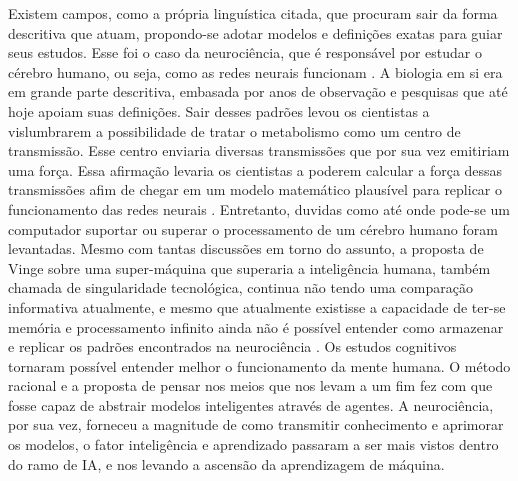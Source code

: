 Existem campos, como a própria linguística citada, que procuram sair da forma descritiva que atuam, propondo-se adotar modelos e definições exatas para guiar seus estudos. Esse foi o caso da neurociência, que é responsável por estudar o cérebro humano, ou seja, como as redes neurais funcionam \cite[10]{russell2003artificial}. A biologia em si era em grande parte descritiva, embasada por anos de observação e pesquisas que até hoje apoiam suas definições. Sair desses padrões levou os cientistas a vislumbrarem a possibilidade de tratar o metabolismo como um centro de transmissão. Esse centro enviaria diversas transmissões que por sua vez emitiriam uma força. Essa afirmação levaria os cientistas a poderem calcular a força dessas transmissões afim de chegar em um modelo matemático plausível para replicar o funcionamento das redes neurais \cite[1-3]{rashevsky1960mathematical}. Entretanto, duvidas como até onde pode-se um computador suportar ou superar o processamento de um cérebro humano foram levantadas. Mesmo com tantas discussões em torno do assunto, a proposta de Vinge sobre uma super-máquina que superaria a inteligência humana, também chamada de singularidade tecnológica, continua não tendo uma comparação informativa atualmente, e mesmo que atualmente existisse a capacidade de ter-se memória e processamento infinito ainda não é possível entender como armazenar e replicar os padrões encontrados na neurociência \cite[11-12]{vinge1993coming,russell2003artificial}. Os estudos cognitivos tornaram possível entender melhor o funcionamento da mente humana. O método racional e a proposta de pensar nos meios que nos levam a um fim fez com que fosse capaz de abstrair modelos inteligentes através de agentes. A neurociência, por sua vez, forneceu a magnitude de como transmitir conhecimento e aprimorar os modelos, o fator inteligência e aprendizado passaram a ser mais vistos dentro do ramo de IA, e nos levando a ascensão da aprendizagem de máquina.

